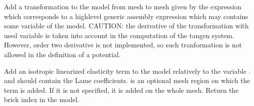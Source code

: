 \documentclass[a4paper,11pt,english]{sphinxmanual}
\begin{document}
\begin{fulllineitems}
\begin{fulllineitems}
\end{fulllineitems}


\begin{fulllineitems}
\label{\detokenize{python/cmdref_Model:getfem.Model.add_interpolate_transformation_from_expression}}
Add a transformation to the model from mesh  to mesh
 given by the expression  which corresponds to a
high\sphinxhyphen{}level generic assembly expression which may contains some
variable of the model. CAUTION: the derivative of the
transformation with used variable is taken into account in the
computation of the tangen system. However, order two derivative is not
implemented, so such tranformation is not allowed in the definition
of a potential.

\end{fulllineitems}


\begin{fulllineitems}
\label{\detokenize{python/cmdref_Model:getfem.Model.add_isotropic_linearized_elasticity_brick}}
Add an isotropic linearized elasticity term to the model relatively to
the variable .  and  should
contain the Lame coefficients.  is an optional mesh region
on which the term is added. If it is not specified, it is added
on the whole mesh. Return the brick index in the model.

\end{fulllineitems}



\end{fulllineitems}
\end{document}
